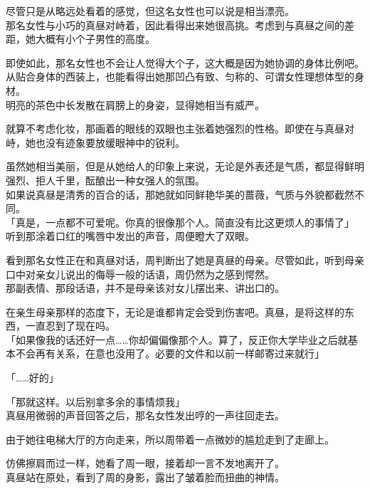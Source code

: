 尽管只是从略远处看着的感觉，但这名女性也可以说是相当漂亮。\\

那名女性与小巧的真昼对峙着，因此看得出来她很高挑。考虑到与真昼之间的差距，她大概有小个子男性的高度。

即使如此，那名女性也不会让人觉得大个子，这大概是因为她协调的身体比例吧。从贴合身体的西装上，也能看得出她那凹凸有致、匀称的、可谓女性理想体型的身材。\\

明亮的茶色中长发散在肩膀上的身姿，显得她相当有威严。

就算不考虑化妆，那画着的眼线的双眼也主张着她强烈的性格。即使在与真昼对峙，她也没有迹象要放缓眼神中的锐利。

虽然她相当美丽，但是从她给人的印象上来说，无论是外表还是气质，都显得鲜明强烈、拒人千里，酝酿出一种女强人的氛围。\\

如果说真昼是清秀的百合的话，那她就如同鲜艳华美的蔷薇，气质与外貌都截然不同。\\

「真是，一点都不可爱呢。你真的很像那个人。简直没有比这更烦人的事情了」\\

听到那涂着口红的嘴唇中发出的声音，周便瞪大了双眼。

看到那名女性正在和真昼对话，周判断出了她是真昼的母亲。尽管如此，听到母亲口中对亲女儿说出的侮辱一般的话语，周仍然为之感到愕然。\\

那副表情、那段话语，并不是母亲该对女儿摆出来、讲出口的。

在亲生母亲那样的态度下，无论是谁都肯定会受到伤害吧。真昼，是将这样的东西，一直忍到了现在吗。\\

「如果像我的话还好一点……你却偏偏像那个人。算了，反正你大学毕业之后就基本不会再有关系，在意也没用了。必要的文件和以前一样邮寄过来就行」

「……好的」

「那就这样。以后别拿多余的事情烦我」\\

真昼用微弱的声音回答之后，那名女性发出哼的一声往回走去。

由于她往电梯大厅的方向走来，所以周带着一点微妙的尴尬走到了走廊上。

仿佛擦肩而过一样，她看了周一眼，接着却一言不发地离开了。\\

真昼站在原处，看到了周的身影，露出了皱着脸而扭曲的神情。\\

